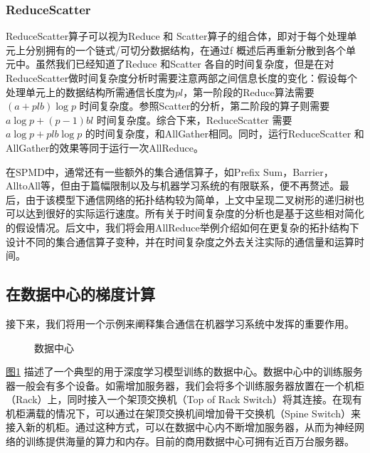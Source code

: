 \documentclass[letterpaper,10pt,english]{sphinxmanual}
\let\sphinxpxdimen\pdfpxdimen\else\newdimen\sphinxpxdimen
\begin{document}
\subsubsection{ReduceScatter}
\label{\detokenize{chapter_distributed_training/collective:reducescatter}}
\sphinxAtStartPar
ReduceScatter算子可以视为Reduce 和
Scatter算子的组合体，即对于每个处理单元上分别拥有的一个链式/可切分数据结构，在通过f
概述后再重新分散到各个单元中。虽然我们已经知道了Reduce 和Scatter
各自的时间复杂度，但是在对ReduceScatter做时间复杂度分析时需要注意两部之间信息长度的变化：假设每个处理单元上的数据结构所需通信长度为\(pl\)，第一阶段的Reduce算法需要\((a+plb)\log p\)
时间复杂度。参照Scatter的分析，第二阶段的算子则需要
\(a \log p + (p-1) bl\) 时间复杂度。综合下来，ReduceScatter 需要
\(a \log p + plb \log p\)
的时间复杂度，和AllGather相同。同时，运行ReduceScatter 和
AllGather的效果等同于运行一次AllReduce。

\sphinxAtStartPar
在SPMD中，通常还有一些额外的集合通信算子，如Prefix
Sum，Barrier，All\sphinxhyphen{}to\sphinxhyphen{}All等，但由于篇幅限制以及与机器学习系统的有限联系，便不再赘述。最后，由于该模型下通信网络的拓扑结构较为简单，上文中呈现二叉树形的递归树也可以达到很好的实际运行速度。所有关于时间复杂度的分析也是基于这些相对简化的假设情况。后文中，我们将会用AllReduce举例介绍如何在更复杂的拓扑结构下设计不同的集合通信算子变种，并在时间复杂度之外去关注实际的通信量和运算时间。


\subsection{在数据中心的梯度计算}
\label{\detokenize{chapter_distributed_training/collective:id6}}
\sphinxAtStartPar
接下来，我们将用一个示例来阐释集合通信在机器学习系统中发挥的重要作用。

\begin{figure}[H]
\centering
\capstart

\noindent\sphinxincludegraphics[width=800\sphinxpxdimen]{{ch10-datacentre}.png}
\caption{数据中心}\label{\detokenize{chapter_distributed_training/collective:id19}}\label{\detokenize{chapter_distributed_training/collective:ch10-datacentre}}\end{figure}

\sphinxAtStartPar
\hyperref[\detokenize{chapter_distributed_training/collective:ch10-datacentre}]{图\ref{\detokenize{chapter_distributed_training/collective:ch10-datacentre}}}
描述了一个典型的用于深度学习模型训练的数据中心。数据中心中的训练服务器一般会有多个设备。如需增加服务器，我们会将多个训练服务器放置在一个机柜（Rack）上，同时接入一个架顶交换机（Top
of Rack
Switch）将其连接。在现有机柜满载的情况下，可以通过在架顶交换机间增加骨干交换机（Spine
Switch）来接入新的机柜。通过这种方式，可以在数据中心内不断增加服务器，从而为神经网络的训练提供海量的算力和内存。目前的商用数据中心可拥有近百万台服务器。
\end{document}

